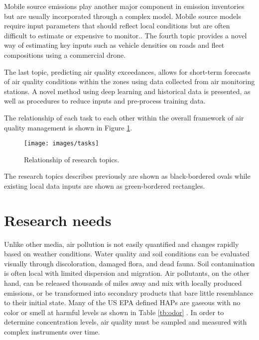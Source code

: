 Mobile source emissions play another major component in emission inventories but are usually incorporated through a complex model. Mobile source models require input parameters that should reflect local conditions but are often difficult to estimate or expensive to monitor.. The fourth topic provides a novel way of estimating key inputs such as vehicle densities on roads and fleet compositions using a commercial drone.

The last topic, predicting air quality exceedances, allows for short-term forecasts of air quality conditions within the zones using data collected from air monitoring stations. A novel method using deep learning and historical data is presented, as well as procedures to reduce inputs and pre-process training data. 

The relationship of each task to each other within the overall framework of air quality management is shown in Figure \ref{fig:tasks}.
%
\begin{figure}[H]
\centering
\texttt{[image: images/tasks]}  %
\caption{Relationship of research topics.}
\label{fig:tasks}
\end{figure}

The research topics describes previously are shown as black-bordered ovals while existing local data inputs are shown as green-bordered rectangles.
%

\section{Research needs}

Unlike other media,  air pollution is not easily quantified and changes rapidly based on weather conditions. Water quality and soil conditions can be evaluated visually through discoloration, damaged flora, and dead fauna. Soil contamination is often local with limited dispersion and migration. Air pollutants, on the other hand, can be released thousands of miles away and mix with locally produced emissions, or be transformed into secondary products that bare little resemblance to their initial state. Many of the US EPA defined HAPs are gaseous with no color or smell at harmful levels as shown in Table \ref{tb:odor} \citep{Murnane2013}. In order to determine concentration levels, air quality must be sampled and measured with complex instruments over time.

